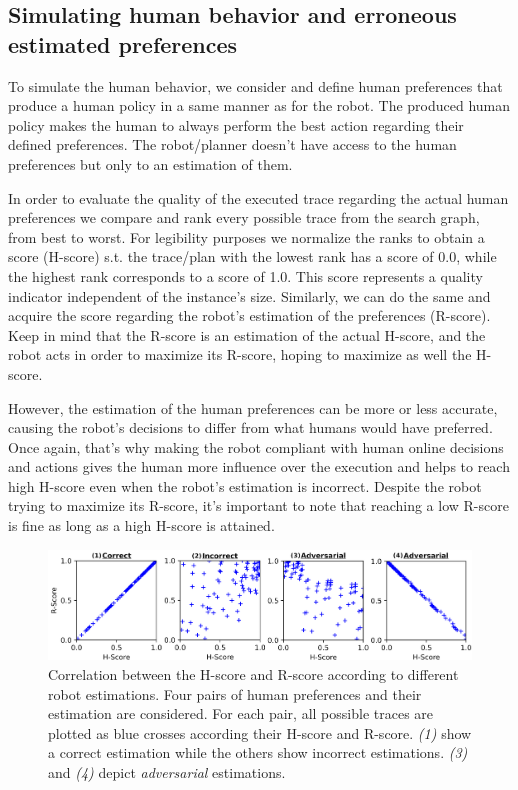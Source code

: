     \subsection{Simulating human behavior and erroneous estimated preferences}

To simulate the human behavior, we consider and define human preferences that produce a human policy in a same manner as for the robot. The produced human policy makes the human to always perform the best action regarding their defined preferences. The robot/planner doesn't have access to the human preferences but only to an estimation of them.

In order to evaluate the quality of the executed trace regarding the actual human preferences we compare and rank every possible trace from the search graph, from best to worst. For legibility purposes we normalize the ranks to obtain a score (H-score) s.t. the trace/plan with the lowest rank has a score of 0.0, while the highest rank corresponds to a score of 1.0. This score represents a quality indicator independent of the instance's size. 
Similarly, we can do the same and acquire the score regarding the robot's estimation of the preferences (R-score). 
Keep in mind that the R-score is an estimation of the actual H-score, and the robot acts in order to maximize its R-score, hoping to maximize as well the H-score.

However, the estimation of the human preferences can be more or less accurate, causing the robot's decisions to differ from what humans would have preferred. Once again, that's why making the robot compliant with human online decisions and actions gives the human more influence over the execution and helps to reach high H-score even when the robot's estimation is incorrect.
Despite the robot trying to maximize its R-score, it's important to note that reaching a low R-score is fine as long as a high H-score is attained.

\begin{figure}
    \includegraphics[width=\linewidth]{images/Chapter4/all_corr.png}
    \caption{
    Correlation between the H-score and R-score according to different robot estimations. Four pairs of human preferences and their estimation are considered. For each pair, all possible traces are plotted as blue crosses according their H-score and R-score. \textit{(1)} show a correct estimation while the others show incorrect estimations. \textit{(3)} and \textit{(4)} depict \textit{adversarial} estimations.
    }
    \label{fig:corr}
\end{figure}

